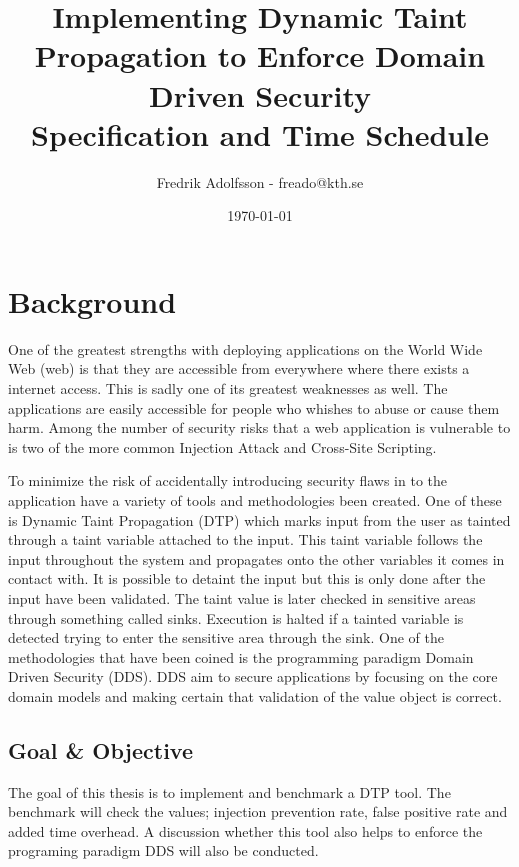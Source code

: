 \documentclass{../kththesis}
\title{Implementing Dynamic Taint Propagation to Enforce Domain Driven Security \\
        \large Specification and Time Schedule}
\author{Fredrik Adolfsson - freado@kth.se}
\date{\today}
\begin{document}
\frontmatter


\titlepage


\tableofcontents


\mainmatter



\chapter{Background}
One of the greatest strengths with deploying applications on the World Wide Web (web) is that they are accessible from everywhere where there exists a internet access. This is sadly one of its greatest weaknesses as well. The applications are easily accessible for people who whishes to abuse or cause them harm. Among the number of security risks that a web application is vulnerable to is two of the more common Injection Attack and Cross-Site Scripting. \parencite{OpenWebApplicationSecurityProject, CrossMichael2007Dgtw}

To minimize the risk of accidentally introducing security flaws in to the application have a variety of tools and methodologies been created. One of these is Dynamic Taint Propagation (DTP) which marks input from the user as tainted through a taint variable attached to the input. This taint variable follows the input throughout the system and propagates onto the other variables it comes in contact with. It is possible to detaint the input but this is only done after the input have been validated. The taint value is later checked in sensitive areas through something called sinks. Execution is halted if a tainted variable is detected trying to enter the sensitive area through the sink. \parencite{Pan2015, Venkataramani2008} One of the methodologies that have been coined is the programming paradigm Domain Driven Security (DDS). DDS aim to secure applications by focusing on the core domain models and making certain that validation of the value object is correct. \parencite{Wilander2009, Johnsson2009}


\section{Goal \& Objective}
The goal of this thesis is to implement and benchmark a DTP tool. The benchmark will check the values; injection prevention rate, false positive rate and added time overhead. A discussion whether this tool also helps to enforce the programing paradigm DDS will also be conducted.
\end{document}
